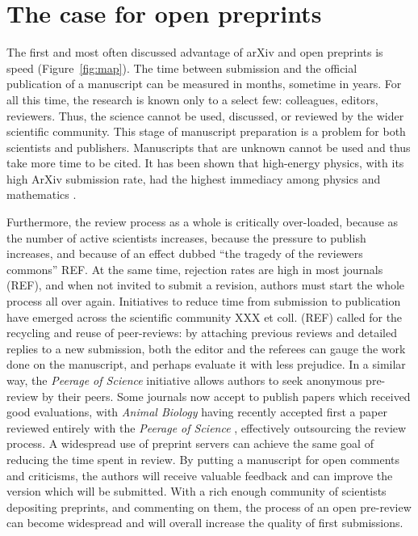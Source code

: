 \documentclass[letterpaper,twocolumn,superscriptaddress,showkeys]{revtex4}
\begin{document}
\section{The case for open preprints}

The first and most often discussed advantage of arXiv and open
preprints is speed (Figure~\ref{fig:map}). The time between submission
and the official publication of a manuscript can be measured in
months, sometime in years. For all this time, the research is known
only to a select few: colleagues, editors, reviewers.  Thus, the
science cannot be used, discussed, or reviewed by the wider scientific
community.  This stage of manuscript preparation is a problem for both
scientists and publishers.  Manuscripts that are unknown cannot be
used and thus take more time to be cited. It has been shown that
high-energy physics, with its high ArXiv submission rate, had the
highest immediacy among physics and mathematics \cite{pra05}.

Furthermore, the review process as a whole is critically over-loaded,
because as the number of active scientists increases, because the
pressure to publish increases, and because of an effect dubbed ``the
tragedy of the reviewers commons'' REF.  At the same time, rejection
rates are high in most journals (REF), and when not invited to submit
a revision, authors must start the whole process all over again.
Initiatives to reduce time from submission to publication have emerged
across the scientific community XXX et coll.  (REF) called for the
recycling and reuse of peer-reviews: by attaching previous reviews and
detailed replies to a new submission, both the editor and the referees
can gauge the work done on the manuscript, and perhaps evaluate it
with less prejudice. In a similar way, the \emph{Peerage of Science}
initiative allows authors to seek anonymous pre-review by their
peers. Some journals now accept to publish papers which received good
evaluations, with \emph{Animal Biology} having recently accepted first
a paper reviewed entirely with the \emph{Peerage of Science}
\cite{abb12}, effectively outsourcing the review process. A widespread
use of preprint servers can achieve the same goal of reducing the time
spent in review. By putting a manuscript for open comments and
criticisms, the authors will receive valuable feedback and can improve
the version which will be submitted. With a rich enough community of
scientists depositing preprints, and commenting on them, the process
of an open pre-review can become widespread and will overall increase
the quality of first submissions.
\end{document}
